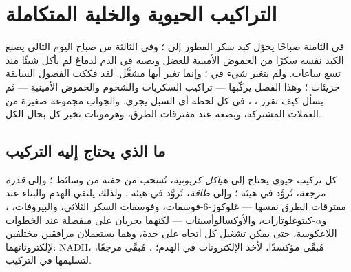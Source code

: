 \chapter{التراكيب الحيوية والخلية المتكاملة}\label{ch:b1:biosyntheses-integration}

في الثامنة صباحًا يحوّل كبد سكر الفطور إلى  ؛ وفي الثالثة
من صباح اليوم التالي يصنع الكبد نفسه سكرًا من الحموض الأمينية للعضل
ويصبه في الدم لدماغ لم يأكل شيئًا منذ تسع ساعات. ولم يتغير شيء في
؛ وإنما تغير أيها مشغَّل. لقد فككت الفصول السابقة جزيئات
؛ وهذا الفصل يركّبها --- تراكيب السكريات  والشحوم
والحموض الأمينية --- ثم يسأل كيف تقرر ، ، في كل لحظة أي
السبل يجري. والجواب مجموعة صغيرة من العملات المشتركة، وبضعة 
عند مفترقات الطرق، وهرمونات تخبر كل  بحال الكل.

\section{ما الذي يحتاج إليه التركيب}

\begin{proposition}\label{prop:b1:biosyntheses-integration:needs}
كل تركيب حيوي يحتاج إلى \emph{هياكل كربونية}، تُسحب من حفنة من وسائط
 ؛ وإلى \emph{قدرة مرجعة}، تُزوَّد في هيئة
؛ وإلى \emph{طاقة}، تُزوَّد في هيئة . ولذلك يلتقي الهدم
والبناء عند مفترقات الطرق نفسها --- غلوكوز-6-فوسفات، وفوسفات السكر
الثلاثي، والبيروفات، ، و$\alpha$-كيتوغلوتارات،
والأوكسالوأسيتات --- لكنهما يجريان على  منفصلة عند الخطوات
اللاعكوسة، حتى يمكن تشغيل كل اتجاه على حدة، وهما يستعملان مرافقين
مختلفين لإلكتروناتهما: NADH، مُبقًى مؤكسدًا، لأخذ الإلكترونات في
الهدم؛ ، مُبقًى مرجعًا، لتسليمها في التركيب.
\end{proposition}


